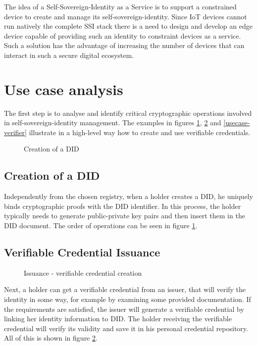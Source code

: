 
The idea of a Self-Sovereign-Identity as a Service is to support a constrained device to create and manage its self-sovereign-identity. Since IoT devices cannot run natively the complete SSI stack there is a need to design and develop an edge device capable of providing such an identity to constraint devices as a service.  Such a solution has the advantage of increasing the number of devices that can interact in such a secure digital ecosystem.

\section{Use case analysis}
The first step is to analyse and identify critical cryptographic operations involved in self-sovereign-identity management. The examples in figures \ref{usecase-did}, \ref{usecase-issuer} and \ref{usecase-verifier} illustrate in a high-level way how to create and use verifiable credentials. 
\begin{figure}[!h]
    \centering
    
    \caption{Creation of a DID}
    \label{usecase-did}
\end{figure}

\subsection{Creation of a DID}
Independently from the chosen registry, when a holder creates a DID, he uniquely binds cryptographic proofs with the DID identifier. In this process, the holder typically needs to generate public-private key pairs and then insert them in the DID document. The order of operations can be seen in figure \ref{usecase-did}. 
\subsection{Verifiable Credential Issuance}
\begin{figure}[!h]
    \centering
    
    \caption{Issuance - verifiable credential creation}
    \label{usecase-issuer}
\end{figure}
Next, a holder can get a verifiable credential from an issuer, that will verify the identity in some way, for example by examining some provided documentation. If the requirements are satisfied, the issuer will generate a verifiable credential by linking her identity information to DID. The holder receiving the verifiable credential will verify its validity and save it in his personal credential repository. All of this is shown in figure \ref{usecase-issuer}. 

